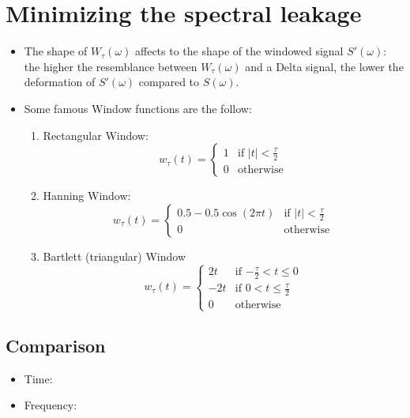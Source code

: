 \section{Minimizing the spectral leakage~\cite{lathi1998modern}}

\begin{itemize}
\item The shape of $W_\tau(\omega)$ affects to the shape of the
  windowed signal $S'(\omega)$: the higher the resemblance between
  $W_\tau(\omega)$ and a Delta signal, the lower the deformation of
  $S'(\omega)$ compared to $S(\omega)$.

\item Some famous Window functions are the follow:
  \begin{enumerate}
  \item Rectangular Window:
    \begin{equation}
      w_\tau(t) =
      \left\{
      \begin{array}{ll}
        1 & \text{if $|t|<\frac{\tau}{2}$}\\
        0 & \text{otherwise}
      \end{array}
      \right.
    \end{equation}

  \item Hanning Window:
    \begin{equation}
      w_\tau(t) =
      \left\{
      \begin{array}{ll}
        0.5-0.5\cos(2\pi t) & \text{if $|t|<\frac{\tau}{2}$}\\
        0 & \text{otherwise}
      \end{array}
      \right.
    \end{equation}

  \item Bartlett (triangular) Window
    \begin{equation}
      w_\tau(t) =
      \left\{
      \begin{array}{ll}
        2t & \text{if $-\frac{\tau}{2}<t\le 0$}\\
        -2t & \text{if $0<t\le \frac{\tau}{2}$}\\
        0 & \text{otherwise}
      \end{array}
      \right.
    \end{equation}
    
  \end{enumerate}
  
\end{itemize}

\subsection*{Comparison}
\begin{itemize}
\item Time:
\item Frequency:
\end{itemize}

